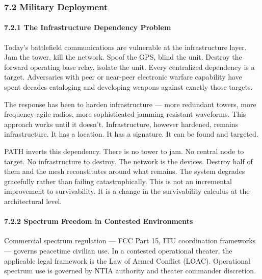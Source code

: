 \documentclass[
  11pt,
]{article}
\begin{document}
\hypertarget{military-deployment}{%
\subsubsection{7.2 Military Deployment}\label{military-deployment}}

\hypertarget{the-infrastructure-dependency-problem}{%
\paragraph{7.2.1 The Infrastructure Dependency
Problem}\label{the-infrastructure-dependency-problem}}

Today's battlefield communications are vulnerable at the infrastructure
layer. Jam the tower, kill the network. Spoof the GPS, blind the unit.
Destroy the forward operating base relay, isolate the unit. Every
centralized dependency is a target. Adversaries with peer or near-peer
electronic warfare capability have spent decades cataloging and
developing weapons against exactly those targets.

The response has been to harden infrastructure --- more redundant
towers, more frequency-agile radios, more sophisticated
jamming-resistant waveforms. This approach works until it doesn't.
Infrastructure, however hardened, remains infrastructure. It has a
location. It has a signature. It can be found and targeted.

PATH inverts this dependency. There is no tower to jam. No central node
to target. No infrastructure to destroy. The network is the devices.
Destroy half of them and the mesh reconstitutes around what remains. The
system degrades gracefully rather than failing catastrophically. This is
not an incremental improvement to survivability. It is a change in the
survivability calculus at the architectural level.

\hypertarget{spectrum-freedom-in-contested-environments}{%
\paragraph{7.2.2 Spectrum Freedom in Contested
Environments}\label{spectrum-freedom-in-contested-environments}}

Commercial spectrum regulation --- FCC Part 15, ITU coordination
frameworks --- governs peacetime civilian use. In a contested
operational theater, the applicable legal framework is the Law of Armed
Conflict (LOAC). Operational spectrum use is governed by NTIA authority
and theater commander discretion.
\end{document}

